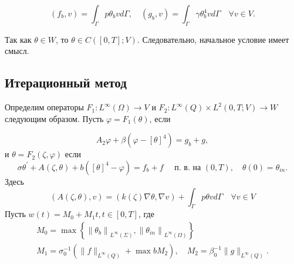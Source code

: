 \[
    \left(f_{b}, v\right)=\int_{\Gamma} p \theta_{b} v d \Gamma,
    \quad\left(g_{b}, v\right)=\int_{\Gamma} \gamma \theta_{b}^{4} v d \Gamma \quad \forall v \in V.
\]

\begin{remark}
    Так как $\theta \in W$, то $\theta \in C([0, T] ; V)$.
    Следовательно, начальное условие имеет смысл.
\end{remark}

\subsection{Итерационный метод}
\label{subsec:ch3/sec1/iterative}
Определим операторы
$F_{1}: L^{\infty}(\Omega) \rightarrow V$ и $F_{2}: L^{\infty}(Q) \times L^{2}(0, T ;V) \rightarrow W$
следующим образом.
Пусть $\varphi=F_{1}(\theta)$, если

\begin{equation}
    \label{eq:3_1:6}
    A_{2} \varphi+\beta\left(\varphi-[\theta]^{4}\right)=g_{b}+g,
\end{equation}
и $\theta=F_{2}(\zeta, \varphi)$ если
\begin{equation}
    \label{eq:3_1:7}
    \sigma \theta^{\prime}+A(\zeta, \theta)+b\left([\theta]^{4}-\varphi\right)=f_{b}
    +f \quad \text { п. в. на }(0, T), \quad \theta(0)=\theta_{i n}.
\end{equation}
Здесь
\[
    (A(\zeta, \theta), v)=(k(\zeta) \nabla \theta, \nabla v)
    +\int_{\Gamma} p \theta v d \Gamma \quad \forall v \in V
\]
Пусть $w(t)=M_{0}+M_{1} t, t \in[0, T]$, где
\[
    \begin{gathered}
        M_{0}=\max \left\{\left\|\theta_{b}\right\|_{L^{\infty}(\Sigma)},
        \left\|\theta_{i n}\right\|_{L^{\infty}(\Omega)}\right\} \\
        M_{1}=\sigma_{0}^{-1}\left(\|f\|_{L^{\infty}(Q)}+\max b M_{2}\right),
        \quad M_{2}=\beta_{0}^{-1}\|g\|_{L^{\infty}(Q)}.
    \end{gathered}
\]

